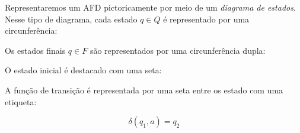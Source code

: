 Representaremos um AFD pictoricamente por meio de um {\em diagrama de estados}.
Nesse tipo de diagrama, cada estado $q \in Q$ é representado por uma circunferência:

\begin{center}
\end{center}

Os estados finais $q \in F$ são representados por uma circunferência dupla:

\begin{center}
\end{center}

O estado inicial é destacado com uma seta:

\begin{center}
\end{center}

A função de transição é representada por uma seta entre os estado com uma etiqueta:

\begin{center}
\end{center}

\begin{displaymath}
  \delta(q_1, a) = q_2
\end{displaymath}



